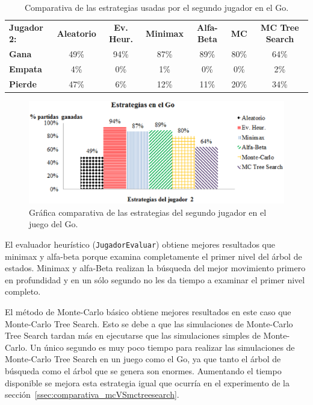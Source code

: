 \begin{table}[t]
\centering
\caption[Comparativa de estrategias en el Go (II)]{Comparativa de las estrategias usadas por el segundo jugador en el Go.}
\label{tab:comparativa_estrategias2}
\begin{tabular}{lcccccc}
\hline
\textbf{Jugador 2:} & \textbf{Aleatorio} & \textbf{Ev. Heur.} & \textbf{Minimax} & \textbf{Alfa-Beta} & \textbf{MC} & \textbf{MC Tree Search} \\
\textbf{Gana} & 49\% & 94\% & 87\%  & 89\% & 80\% & 64\% \\
\textbf{Empata} & 4\% & 0\% & 1\% & 0\% & 0\% & 2\% \\
\textbf{Pierde} & 47\% & 6\%  & 12\% & 11\% & 20\% & 34\% \\
\hline
\end{tabular}
\end{table} 

\begin{figure}[!h]
	\centering
	\includegraphics[scale=0.3]{contenido/cap7/imagenes/estrategiasGo2.eps}
	\caption[Comparativa de estrategias en el Go (II)]{Gráfica comparativa de las estrategias del segundo jugador en el juego del Go.}
	\label{fig:comparativa_estrategias2}
\end{figure} 

El evaluador heurístico (\texttt{JugadorEvaluar}) obtiene mejores resultados que minimax y alfa-beta porque examina completamente el primer nivel del árbol de estados.
Minimax y alfa-Beta realizan la búsqueda del mejor movimiento primero en profundidad y en un sólo segundo no les da tiempo a examinar el primer nivel completo.

El método de Monte-Carlo básico obtiene mejores resultados en este caso que Monte-Carlo Tree Search.
Esto se debe a que las simulaciones de Monte-Carlo Tree Search tardan más en ejecutarse que las simulaciones simples de Monte-Carlo.
Un único segundo es muy poco tiempo para realizar las simulaciones de Monte-Carlo Tree Search en un juego como el Go, ya que tanto el árbol de búsqueda como el árbol que se genera son enormes.
Aumentando el tiempo disponible se mejora esta estrategia igual que ocurría en el experimento de la sección~\ref{ssec:comparativa_mcVSmctreesearch}.

